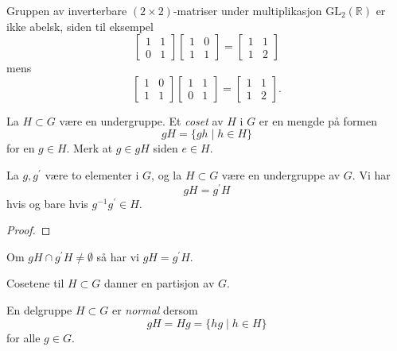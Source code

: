 \begin{example}
    Gruppen av inverterbare $(2\times 2)$-matriser under multiplikasjon
    $\mathrm{GL}_2(\mathbb R)$
    er ikke abelsk, siden til eksempel
    \[
        \begin{bmatrix}
            1 & 1\\
            0 & 1
        \end{bmatrix}
        \begin{bmatrix}
            1 & 0\\
            1 & 1
        \end{bmatrix}
        =
        \begin{bmatrix}
            1 & 1\\
            1 & 2
        \end{bmatrix}
    \]
    mens
    \[
        \begin{bmatrix}
            1 & 0\\
            1 & 1
        \end{bmatrix}
        \begin{bmatrix}
            1 & 1\\
            0 & 1
        \end{bmatrix}
        =
        \begin{bmatrix}
            1 & 1\\
            1 & 2
        \end{bmatrix}.
    \]
\end{example}

\begin{definition}
    La $H\subset G$ være en undergruppe.
    Et \textit{coset} av $H$ i $G$ er en mengde på formen
    \[
        gH = \{gh\mid h\in H\}
    \]
    for en $g\in H$.
    Merk at $g\in gH$ siden $e\in H$.
\end{definition}

\begin{lemma}
    La $g, g^\prime$ være to elementer i $G$,
    og la $H\subset G$ være en undergruppe av $G$.
    Vi har
    \[
        gH = g^\prime H
    \]
    hvis og bare hvis $g^{-1} g^\prime\in H$.
\end{lemma}
\begin{proof}
\end{proof}

\begin{corollary}
    Om $gH\cap g^\prime H\neq \emptyset$ så har vi $gH = g^\prime H$.
\end{corollary}

\begin{corollary}
    Cosetene til $H\subset G$ danner en partisjon av $G$.
\end{corollary}

\begin{definition}
    En delgruppe $H\subset G$ er \textit{normal}
    dersom
    \[
        gH = Hg = \{hg\mid h\in H\}
    \]
    for alle $g\in G$.
\end{definition}
